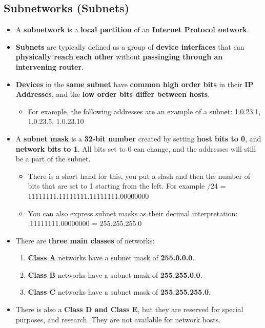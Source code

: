 \documentclass{article}
\begin{document}
    \subsection*{Subnetworks (Subnets)}
    \begin{itemize}
        \item A \textbf{subnetwork} is a \textbf{local partition} of an \textbf{Internet Protocol network}.
        \item \textbf{Subnets} are typically defined as a group of \textbf{device interfaces} that can \textbf{physically reach each other} without \textbf{passinging through an intervening router}.
        \item \textbf{Devices} in the \textbf{same subnet} have \textbf{common high order bits} in their \textbf{IP Addresses}, and the \textbf{low order bits differ between hosts}.
        \begin{itemize}
            \item For example, the following addresses are an example of a subnet: 1.0.23.1, 1.0.23.5, 1.0.23.10
        \end{itemize}
        \item A \textbf{subnet mask} is a \textbf{32-bit number} created by setting \textbf{host bits to 0}, and \textbf{network bits to 1}. All bits set to 0 can change, and the addresses will still be a part of the subnet.
        \begin{itemize}
            \item There is a short hand for this, you put a slash and then the number of bits that are set to 1 starting from the left. For example /24 = 11111111.11111111.11111111.00000000
            \item You can also express subnet masks as their decimal interpretation: .11111111.00000000 = 255.255.255.0
        \end{itemize}
        \item There are \textbf{three main classes} of networks:
        \begin{enumerate}
            \item \textbf{Class A} networks have a subnet mask of \textbf{255.0.0.0}.
            \item \textbf{Class B} networks have a subnet mask of \textbf{255.255.0.0}.
            \item \textbf{Class C} networks have a subnet mask of \textbf{255.255.255.0}.
        \end{enumerate}
        \item There is also a \textbf{Class D and Class E}, but they are reserved for special purposes, and research. They are not available for network hosts.
    \end{itemize}
\end{document}
